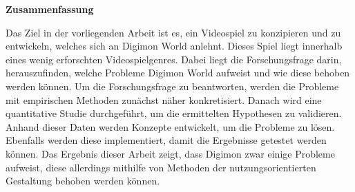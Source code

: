 \newpage

\thispagestyle{empty} %

\vspace*{1cm}
\begin{center}
 {\Huge \bf Zusammenfassung}
\end{center}
\vspace*{1.4cm}

Das Ziel in der vorliegenden Arbeit ist es, ein Videospiel zu konzipieren und zu entwickeln, welches sich an Digimon World anlehnt. Dieses Spiel liegt innerhalb eines wenig erforschten Videospielgenres. Dabei liegt die Forschungsfrage darin, herauszufinden, welche Probleme Digimon World aufweist und wie diese behoben werden können. Um die Forschungsfrage zu beantworten, werden die Probleme mit empirischen Methoden zunächst näher konkretisiert. Danach wird eine quantitative Studie durchgeführt, um die ermittelten Hypothesen zu validieren. Anhand dieser Daten werden Konzepte entwickelt, um die Probleme zu lösen. Ebenfalls werden diese implementiert, damit die Ergebnisse getestet werden können. Das Ergebnis dieser Arbeit zeigt, dass Digimon zwar einige Probleme aufweist, diese allerdings mithilfe von Methoden der nutzungsorientierten Gestaltung behoben werden können.
